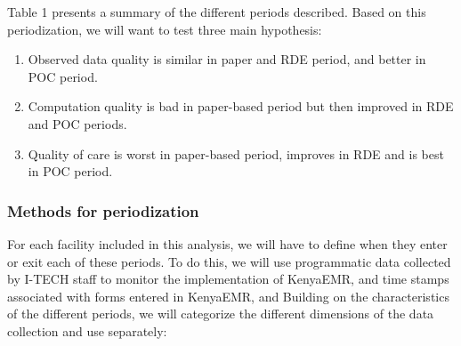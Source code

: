 \documentclass[a4paper,11pt,final,twoside]{article}
\begin{document}
Table 1 presents a summary of the different periods described. Based on this periodization, we will want to test three main hypothesis:
\begin{enumerate}
\item	Observed data quality is similar in paper and RDE period, and better in POC period.
\item	Computation quality is bad in paper-based period but then improved in RDE and POC periods.
\item	Quality of care is worst in paper-based period, improves in RDE and is best in POC period.
\end{enumerate}




        \subsubsection{Methods for periodization}
For each facility included in this analysis, we will have to define when they enter or exit each of these periods. To do this, we will use programmatic data collected by I-TECH staff to monitor the implementation of KenyaEMR, and time stamps associated with forms entered in KenyaEMR, and Building on the characteristics of the different periods, we will categorize the different dimensions of the data collection and use separately:
\end{document}

